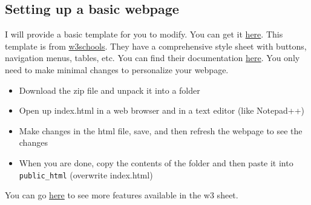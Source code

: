 \documentclass{article}
\begin{document}
\subsection{Setting up a basic webpage}
I will provide a basic template for you to modify. You can get it \href{https://web.njit.edu/~tt73/599.html}{here}. This template is from \href{https://www.w3schools.com/}{w3schools}. They have a comprehensive style sheet with buttons, navigation menus, tables, etc. You can find their documentation \href{https://www.w3schools.com/w3css/w3css_references.asp}{here}. You only need to make minimal changes to personalize your webpage.
\begin{itemize}
    \item Download the zip file and unpack it into a folder
    \item Open up index.html in a web browser and in a text editor (like Notepad++)
    \item Make changes in the html file, save, and then refresh the webpage to see the changes
    \item When you are done, copy the contents of the folder and then paste it into \texttt{public\_html} (overwrite index.html)
\end{itemize}
You can go \href{https://www.w3schools.com/w3css/w3css_intro.asp}{here} to see more features available in the w3 sheet.



\end{document}
